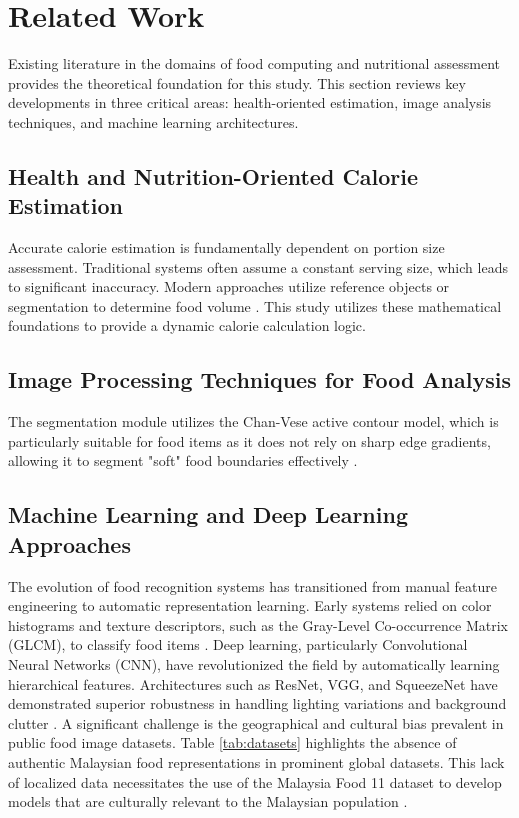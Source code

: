 \documentclass[conference, a4paper]{IEEEtran}
\begin{document}
\section{Related Work}
\label{sec:related_work}

Existing literature in the domains of food computing and nutritional assessment provides the theoretical foundation for this study. This section reviews key developments in three critical areas: health-oriented estimation, image analysis techniques, and machine learning architectures.

\subsection{Health and Nutrition-Oriented Calorie Estimation}
Accurate calorie estimation is fundamentally dependent on portion size assessment. Traditional systems often assume a constant serving size, which leads to significant inaccuracy. Modern approaches utilize reference objects or segmentation to determine food volume \cite{Dalakleidi2022}. This study utilizes these mathematical foundations to provide a dynamic calorie calculation logic.

\subsection{Image Processing Techniques for Food Analysis}
The segmentation module utilizes the Chan-Vese active contour model, which is particularly suitable for food items as it does not rely on sharp edge gradients, allowing it to segment "soft" food boundaries effectively \cite{Chan2001}.

\subsection{Machine Learning and Deep Learning Approaches}
The evolution of food recognition systems has transitioned from manual feature engineering to automatic representation learning. Early systems relied on color histograms and texture descriptors, such as the Gray-Level Co-occurrence Matrix (GLCM), to classify food items \cite{Haralick1973}. Deep learning, particularly Convolutional Neural Networks (CNN), have revolutionized the field by automatically learning hierarchical features. Architectures such as ResNet, VGG, and SqueezeNet have demonstrated superior robustness in handling lighting variations and background clutter \cite{Iandola2016, Niu2024}.
A significant challenge is the geographical and cultural bias prevalent in public food image datasets. Table \ref{tab:datasets} highlights the absence of authentic Malaysian food representations in prominent global datasets. This lack of localized data necessitates the use of the Malaysia Food 11 dataset to develop models that are culturally relevant to the Malaysian population \cite{Tahir2021}.
\end{document}
